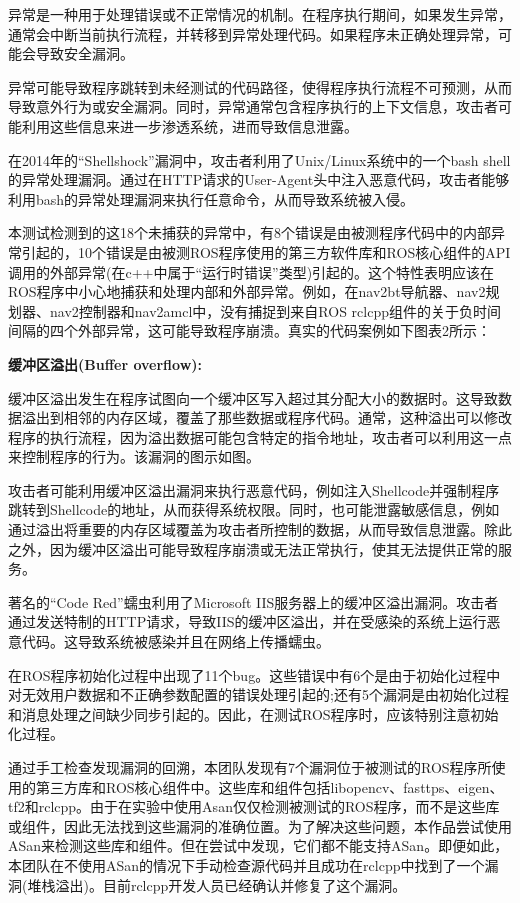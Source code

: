 异常是一种用于处理错误或不正常情况的机制。在程序执行期间，如果发生异常，通常会中断当前执行流程，并转移到异常处理代码。如果程序未正确处理异常，可能会导致安全漏洞。

异常可能导致程序跳转到未经测试的代码路径，使得程序执行流程不可预测，从而导致意外行为或安全漏洞。同时，异常通常包含程序执行的上下文信息，攻击者可能利用这些信息来进一步渗透系统，进而导致信息泄露。

在2014年的``Shellshock''漏洞中，攻击者利用了Unix/Linux系统中的一个bash
shell的异常处理漏洞。通过在HTTP请求的User-Agent头中注入恶意代码，攻击者能够利用bash的异常处理漏洞来执行任意命令，从而导致系统被入侵。

本测试检测到的这18个未捕获的异常中，有8个错误是由被测程序代码中的内部异常引起的，10个错误是由被测ROS程序使用的第三方软件库和ROS核心组件的API调用的外部异常(在c++中属于``运行时错误''类型)引起的。这个特性表明应该在ROS程序中小心地捕获和处理内部和外部异常。例如，在nav2bt导航器、nav2规划器、nav2控制器和nav2amcl中，没有捕捉到来自ROS
rclcpp组件的关于负时间间隔的四个外部异常，这可能导致程序崩溃。真实的代码案例如下图表2所示：


\textbf{缓冲区溢出(Buffer overflow):}

缓冲区溢出发生在程序试图向一个缓冲区写入超过其分配大小的数据时。这导致数据溢出到相邻的内存区域，覆盖了那些数据或程序代码。通常，这种溢出可以修改程序的执行流程，因为溢出数据可能包含特定的指令地址，攻击者可以利用这一点来控制程序的行为。该漏洞的图示如图。

攻击者可能利用缓冲区溢出漏洞来执行恶意代码，例如注入Shellcode并强制程序跳转到Shellcode的地址，从而获得系统权限。同时，也可能泄露敏感信息，例如通过溢出将重要的内存区域覆盖为攻击者所控制的数据，从而导致信息泄露。除此之外，因为缓冲区溢出可能导致程序崩溃或无法正常执行，使其无法提供正常的服务。

著名的``Code Red''蠕虫利用了Microsoft
IIS服务器上的缓冲区溢出漏洞。攻击者通过发送特制的HTTP请求，导致IIS的缓冲区溢出，并在受感染的系统上运行恶意代码。这导致系统被感染并且在网络上传播蠕虫。


在ROS程序初始化过程中出现了11个bug。这些错误中有6个是由于初始化过程中对无效用户数据和不正确参数配置的错误处理引起的;还有5个漏洞是由初始化过程和消息处理之间缺少同步引起的。因此，在测试ROS程序时，应该特别注意初始化过程。

通过手工检查发现漏洞的回溯，本团队发现有7个漏洞位于被测试的ROS程序所使用的第三方库和ROS核心组件中。这些库和组件包括libopencv、fasttps、eigen、tf2和rclcpp。由于在实验中使用Asan仅仅检测被测试的ROS程序，而不是这些库或组件，因此无法找到这些漏洞的准确位置。为了解决这些问题，本作品尝试使用ASan来检测这些库和组件。但在尝试中发现，它们都不能支持ASan。即便如此，本团队在不使用ASan的情况下手动检查源代码并且成功在rclcpp中找到了一个漏洞(堆栈溢出)。目前rclcpp开发人员已经确认并修复了这个漏洞。


